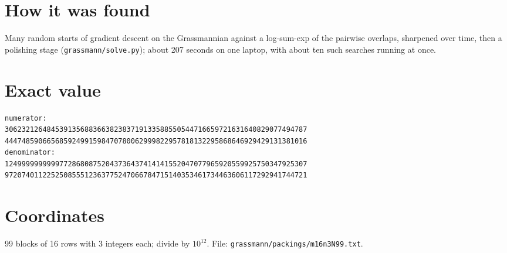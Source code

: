 \documentclass[11pt,a4paper]{article}
\begin{document}
\section{How it was found}
Many random starts of gradient descent on the Grassmannian against a log-sum-exp of the pairwise overlaps, sharpened over time, then a polishing stage (\texttt{grassmann/solve.py}); about 207 seconds on one laptop, with about ten such searches running at once.


\appendix
\section{Exact value}
{\small
\begin{verbatim}
numerator:
306232126484539135688366382383719133588550544716659721631640829077494787
444748590665685924991598470780062999822957818132295868646929429131381016
denominator:
124999999999977286808752043736437414141552047077965920559925750347925307
972074011225250855512363775247066784715140353461734463606117292941744721
\end{verbatim}}

\section{Coordinates}
99 blocks of 16 rows with 3 integers each; divide by $10^{12}$. File: \texttt{grassmann/packings/m16n3N99.txt}.
{\tiny
\begin{multicols}{3}
\end{multicols}}
\end{document}
